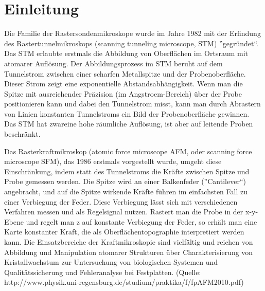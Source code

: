 \chapter{Einleitung}

Die Familie der Rastersondenmikroskope wurde im Jahre 1982 mit der Erfindung des Rastertunnelmikroskops (scanning tunneling microscope, STM) ”gegründet“.
Das STM erlaubte erstmals die Abbildung von Oberflächen im Ortsraum mit atomarer Auflösung.
Der Abbildungsprozess im STM beruht auf dem Tunnelstrom zwischen einer scharfen Metallspitze und der Probenoberfläche. 
Dieser Strom zeigt eine exponentielle Abstandsabhängigkeit. 
Wenn man die Spitze mit ausreichender Präzision (im Angstroem-Bereich) über der Probe positionieren kann und dabei den Tunnelstrom misst, kann man durch Abrastern von Linien konstanten Tunnelstroms ein Bild der Probenoberfläche gewinnen. 
Das STM hat zwareine hohe räumliche Auflösung, ist aber auf leitende Proben beschränkt.

Das Rasterkraftmikroskop (atomic force microscope AFM, oder scanning force microscope SFM), das 1986 erstmals vorgestellt wurde, umgeht diese Einschränkung, indem statt des Tunnelstroms die Kräfte zwischen Spitze und Probe gemessen werden. 
Die Spitze wird an einer Balkenfeder (”Cantilever“) angebracht, und auf die Spitze wirkende Kräfte führen im einfachsten Fall zu einer Verbiegung der Feder. Diese Verbiegung lässt sich mit verschiedenen  Verfahren  messen  und  als  Regelsignal  nutzen.
Rastert  man  die  Probe in  der x-y-Ebene  und  regelt  man z auf  konstante  Verbiegung  der  Feder, so erhält man eine Karte konstanter Kraft, die als Oberflächentopographie interpretiert werden kann.
Die Einsatzbereiche der Kraftmikroskopie sind vielfältig und reichen von Abbildung  und  Manipulation  atomarer  Strukturen über  Charakterisierung von Kristallwachstum zur Untersuchung von biologischen Systemen und Qualitätssicherung und Fehleranalyse bei Festplatten.
(Quelle: http://www.physik.uni-regensburg.de/studium/praktika/f/fpAFM2010.pdf)
